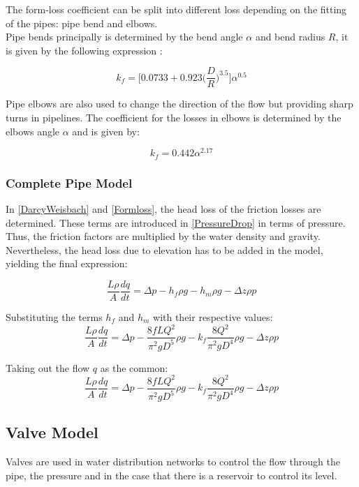 The form-loss coefficient can be split into different loss depending on the 
fitting of the pipes: pipe bend and elbows. 
\\
Pipe bends principally is determined by the 
bend angle $\alpha$ and bend radius $R$, it is given by the following 
expression \cite{Design_Water}: 

\begin{equation}
  k_f = \bigg[0.0733 + 0.923 \bigg(\frac{D}{R}\bigg)^{3.5}\bigg]\alpha^{0.5}
\end{equation}

Pipe elbows are also used to change the direction of the flow but providing 
sharp turns in pipelines. The coefficient for the losses in elbows is determined by the elbows angle $\alpha$ and is given by:

\begin{equation}
  k_f = 0.442\alpha^{2.17}
\end{equation}

\subsubsection{Complete Pipe Model}
In \eqref{DarcyWeisbach} and \eqref{Formloss}, the head loss of the friction losses are determined. These terms are introduced in \eqref{PressureDrop} in terms of pressure. Thus, the friction factors are multiplied by the water density and gravity. Nevertheless, the head loss due to elevation has to be added in the model, yielding the final expression:

\begin{equation}
   \frac{L \rho}{A} \frac{dq}{dt} =\Delta p - h_f \rho g - h_m \rho g - \Delta z \rho p 
\end{equation}

Substituting the terms $h_f$ and $h_m$ with their respective values:
\begin{equation}
   \frac{L \rho}{A} \frac{dq}{dt} =\Delta p - \frac{8fLQ^2}{\pi^{2}gD^5} \rho g - k_f \frac{8Q^2}{\pi^2gD^4} \rho g - \Delta z \rho p 
\end{equation}

Taking out the flow $q$ as the common:
\begin{equation}
   \frac{L \rho}{A} \frac{dq}{dt} =\Delta p - \frac{8fLQ^2}{\pi^{2}gD^5} \rho g - k_f \frac{8Q^2}{\pi^2gD^4} \rho g - \Delta z \rho p 
\end{equation}

\subsection{Valve Model}  
\label{ValveModel}
 Valves are used in water distribution networks to control the flow through the pipe, the pressure and in 
 the case that there is a reservoir to control its level. 
 
